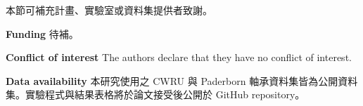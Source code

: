 \documentclass[sn-mathphys-num]{sn-jnl}
\begin{document}
\backmatter

本節可補充計畫、實驗室或資料集提供者致謝。


\textbf{Funding} 待補。

\textbf{Conflict of interest} The authors declare that they have no conflict of interest.

\textbf{Data availability} 本研究使用之 CWRU 與 Paderborn 軸承資料集皆為公開資料集。實驗程式與結果表格將於論文接受後公開於 GitHub repository。


\end{document}
